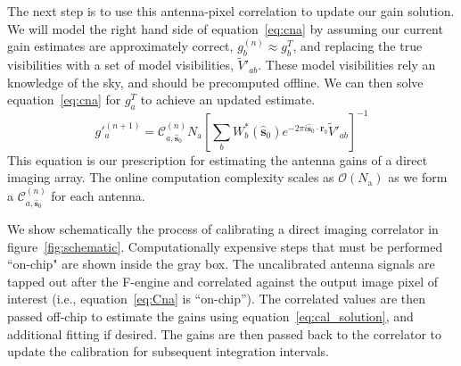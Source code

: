 \documentclass[a4paper,fleqn,usenatbib]{mnras}
\newcommand{\Nant}{\ensuremath{N_{\mathrm{a}}}}
\newcommand{\spix}{\ensuremath{\hat{\mathbf{s}}_{0}}}
\newcommand{\Cna}[1][n]{\ensuremath{\mathcal{C}^{(#1)}_{a,\spix}}}
\newcommand{\rb}{\ensuremath{\mathbf{r}_b}}
\newcommand{\beamtheta}{\ensuremath{W}}
\newcommand{\V}{\ensuremath{\widetilde{V}}}
\begin{document}
The next step is to use this antenna-pixel correlation to update our gain solution. We will model the right hand side of equation~\ref{eq:cna} by assuming our current gain estimates are approximately correct, $g^{(n)}_b\approx g^T_b$, and replacing the true visibilities with a set of model visibilities, $\V'_{ab}$. These model visibilities rely an knowledge of the sky, and should be precomputed offline. We can then solve equation~\ref{eq:cna} for $g^T_a$ to achieve an updated estimate.
\begin{equation}\label{eq:cal_solution}
g'^{(n+1)}_a = \Cna \Nant \left[ \sum_b \beamtheta^*_b(\spix) e^{-2\pi i \spix \cdot \rb} \V'_{ab} \right]^{-1}
\end{equation}
This equation is our prescription for estimating the antenna gains of a direct imaging array. The online computation complexity scales as $\mathcal{O}(\Nant)$ as we form a $\Cna$ for each antenna. 

We show schematically the process of calibrating a direct imaging correlator in figure~\ref{fig:schematic}. Computationally expensive steps that must be performed ``on-chip" are shown inside the gray box. The uncalibrated antenna signals are tapped out after the F-engine and correlated against the output image pixel of interest (i.e., equation~\ref{eq:Cna} is ``on-chip''). The correlated values are then passed off-chip to estimate the gains using equation~\ref{eq:cal_solution}, and additional fitting if desired. The gains are then passed back to the correlator to update the calibration for subsequent integration intervals. 
\end{document}
